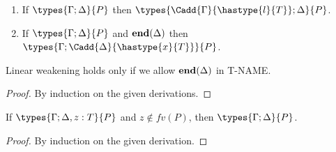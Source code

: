 \begin{lemma}[Weakening]\mbox{}
  \label{lemma:weak}
  \begin{enumerate}
  \item If \( \types{\Gamma; \Delta}{P} \) then
    \( \types{\Cadd{\Gamma}{\hastype{l}{T}};\Delta}{P} \).
      \item If \( \types{\Gamma; \Delta}{P} \) and \( \mathbf{end}(\Delta) \) then
    \( \types{\Gamma;\Cadd{\Delta}{\hastype{x}{T}}}{P} \).
\end{enumerate}
\end{lemma}
\begin{metanote}
  Linear weakening holds only if we allow $\mathbf{end}(\Delta)$ in T-NAME.
\end{metanote}
\begin{proof}
  By induction on the given derivations.
\end{proof}
\begin{lemma}[Strengthening]\mbox{}
  \label{lemma:strenD}
  If \( \types{\Gamma; \Delta, z : T}{P} \) and $z\not\in fv(P)$, then \( \types{\Gamma; \Delta}{P} \).
\end{lemma}
\begin{proof}
  By induction on the given derivation.
\end{proof}

